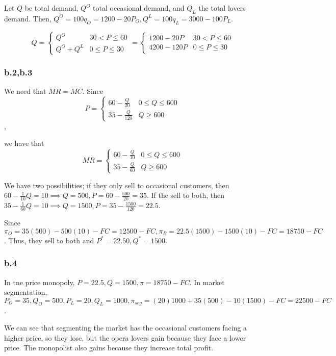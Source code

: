 \documentclass[12pt,letterpaper]{article}
\theoremstyle{definition}
\begin{document}
Let $Q$ be total demand, $Q^O$ total occasional demand, and $Q_L$ the total
lovers demand. Then, $Q^O = 100q_O = 1200 - 20P_O, Q^L = 100q_L = 3000 -
100P_L$.

\[
  Q = \begin{cases}
    Q^O & 30 < P \leq 60 \\
    Q^O + Q^L & 0 \leq P \leq 30
  \end{cases} = \begin{cases}
    1200 - 20P & 30 < P \leq 60 \\
    4200 - 120P & 0 \leq P \leq 30
  \end{cases}
\]

\subsubsection*{b.2,b.3}

We need that $MR = MC$. Since
\[
  P = \begin{cases}
    60 - \frac{Q}{20} & 0 \leq Q \leq 600 \\
    35 - \frac{Q}{120} & Q \geq 600
  \end{cases}
\],

we have that
\[
  MR = \begin{cases}
    60 - \frac{Q}{10} & 0 \leq Q \leq 600 \\
    35 - \frac{Q}{60} & Q \geq 600
  \end{cases}
\]


We have two possibilities; if they only sell to occasional customers, then $60 -
\frac{1}{10}Q = 10 \implies Q = 500, P = 60 -\frac{500}{20} = 35$.  If the sell
to both, then $35 - \frac{1}{60}Q = 10 \implies Q = 1500, P = 35 -
\frac{1500}{120} = 22.5$.

Since $\pi_O = 35(500) - 500(10) - FC = 12500 - FC, \pi_B = 22.5(1500) -
1500(10) - FC = 18750 - FC$. Thus, they sell to both and $P^* = 22.50, Q^* = 1500$.


\subsubsection*{b.4}

In tne price monopoly, $P = 22.5, Q = 1500, \pi = 18750 - FC$. In market
segmentation, $P_O = 35, Q_O = 500, P_L = 20, Q_L = 1000, \pi_{seg} = (20)1000 +
35(500) - 10(1500) - FC = 22500 - FC$.

We can see that segmenting the market has the occasional customers facing a
higher price, so they lose, but the opera lovers gain because they face a lower
price. The monopolist also gains because they increase total profit.
\end{document}
